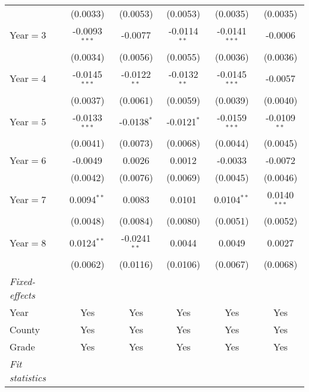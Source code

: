 \begin{table}[htbp]
\begin{tabular}{lccccc}
                           & (0.0033)        & (0.0053)        & (0.0053)        & (0.0035)        & (0.0035)\\
      Year$=$3             & -0.0093$^{***}$ & -0.0077         & -0.0114$^{**}$  & -0.0141$^{***}$ & -0.0006\\
                           & (0.0034)        & (0.0056)        & (0.0055)        & (0.0036)        & (0.0036)\\
      Year$=$4             & -0.0145$^{***}$ & -0.0122$^{**}$  & -0.0132$^{**}$  & -0.0145$^{***}$ & -0.0057\\
                           & (0.0037)        & (0.0061)        & (0.0059)        & (0.0039)        & (0.0040)\\
      Year$=$5             & -0.0133$^{***}$ & -0.0138$^{*}$   & -0.0121$^{*}$   & -0.0159$^{***}$ & -0.0109$^{**}$\\
                           & (0.0041)        & (0.0073)        & (0.0068)        & (0.0044)        & (0.0045)\\
      Year$=$6             & -0.0049         & 0.0026          & 0.0012          & -0.0033         & -0.0072\\
                           & (0.0042)        & (0.0076)        & (0.0069)        & (0.0045)        & (0.0046)\\
      Year$=$7             & 0.0094$^{**}$   & 0.0083          & 0.0101          & 0.0104$^{**}$   & 0.0140$^{***}$\\
                           & (0.0048)        & (0.0084)        & (0.0080)        & (0.0051)        & (0.0052)\\
      Year$=$8             & 0.0124$^{**}$   & -0.0241$^{**}$  & 0.0044          & 0.0049          & 0.0027\\
                           & (0.0062)        & (0.0116)        & (0.0106)        & (0.0067)        & (0.0068)\\
      \midrule \emph{Fixed-effects} &   &   &   &   &  \\
      Year                 & Yes             & Yes             & Yes             & Yes             & Yes\\
      County               & Yes             & Yes             & Yes             & Yes             & Yes\\
      Grade                & Yes             & Yes             & Yes             & Yes             & Yes\\
      \midrule \emph{Fit statistics} &   &   &   &   &  \\

\end{tabular}
\end{table}
